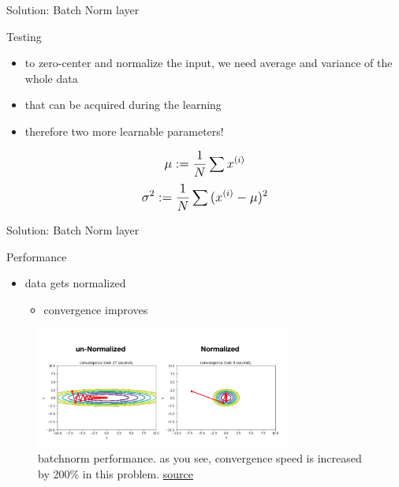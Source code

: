 \begin{frame}{Solution: Batch Norm layer}
	\begin{block}{Testing}
		\begin{itemize}
			\item to zero-center and normalize the input, we need average and variance of the whole data
			\item that can be acquired during the learning
			\item therefore two more learnable parameters!
		\end{itemize}
		\vspace{0.1\textheight}
			\begin{equation}
				\mathlarger{
					\mu := \frac{1}{N} \sum{x^{(i)}}
				}
			\end{equation}
			\begin{equation}
				\mathlarger{
					\sigma^2 := \frac{1}{N} \sum{(x^{(i)} - \mu)^2}
				}
			\end{equation}
	\end{block}
\end{frame}
\begin{frame}{Solution: Batch Norm layer}
	\begin{block}{Performance}
		\begin{itemize}
			\item data gets normalized
			\begin{itemize}
				\item convergence improves
			\end{itemize}
		\end{itemize}
		\begin{figure}[H]
			\centering
			\includegraphics[width=0.75\textwidth]{Figs/section_4/batchnorm_3.png}
			\caption{batchnorm performance. as you see, convergence speed is increased by 200\% in this problem.  \href{https://jsideas.net/batch_normalization/}{source}}
		\end{figure}
	\end{block}
\end{frame}
